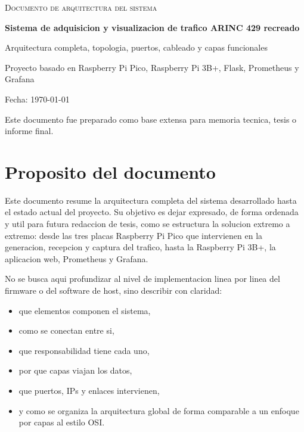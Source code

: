 \documentclass[12pt,a4paper]{report}
\begin{document}
\begin{titlepage}
    \centering
    {\scshape\LARGE Documento de arquitectura del sistema \par}
    \vspace{1.5cm}
    {\huge\bfseries Sistema de adquisicion y visualizacion de trafico ARINC 429 recreado\par}
    \vspace{1.5cm}
    {\Large Arquitectura completa, topologia, puertos, cableado y capas funcionales\par}
    \vfill
    {\large Proyecto basado en Raspberry Pi Pico, Raspberry Pi 3B+, Flask, Prometheus y Grafana\par}
    \vspace{0.5cm}
    {\large Fecha: \today\par}
    \vfill
    {\large Este documento fue preparado como base extensa para memoria tecnica, tesis o informe final.\par}
\end{titlepage}

\tableofcontents
\newpage

\chapter{Proposito del documento}

Este documento resume la arquitectura completa del sistema desarrollado hasta el estado actual del proyecto. Su objetivo es dejar expresado, de forma ordenada y util para futura redaccion de tesis, como se estructura la solucion extremo a extremo: desde las tres placas Raspberry Pi Pico que intervienen en la generacion, recepcion y captura del trafico, hasta la Raspberry Pi 3B+, la aplicacion web, Prometheus y Grafana.

No se busca aqui profundizar al nivel de implementacion linea por linea del firmware o del software de host, sino describir con claridad:

\begin{itemize}
    \item que elementos componen el sistema,
    \item como se conectan entre si,
    \item que responsabilidad tiene cada uno,
    \item por que capas viajan los datos,
    \item que puertos, IPs y enlaces intervienen,
    \item y como se organiza la arquitectura global de forma comparable a un enfoque por capas al estilo OSI.
\end{itemize}
\end{document}
